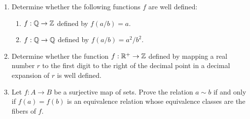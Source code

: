 \begin{enumerate}
	\item Determine whether the following functions $f$ are well defined:
	\begin{enumerate}
		\item $f:\mathbb{Q} \rightarrow \mathbb{Z}$ defined by $f(a/b) = a$.
		\item $f:\mathbb{Q} \rightarrow \mathbb{Q}$ defined by $f(a/b) = a^2/b^2$.
	\end{enumerate}
	\item Determine whether the function $f: \mathbb{R}^+ \rightarrow\mathbb{Z}$ defined by mapping a real number $r$ to the first digit to the right of the decimal point in a decimal expansion of $r$ is well defined.
	\item Let $f:A\rightarrow B$ be a surjective map of sets.  Prove the relation $a\sim b$ if and only if $f(a) = f(b)$ is an equivalence relation whose equivalence classes are the fibers of $f$.
\end{enumerate}


